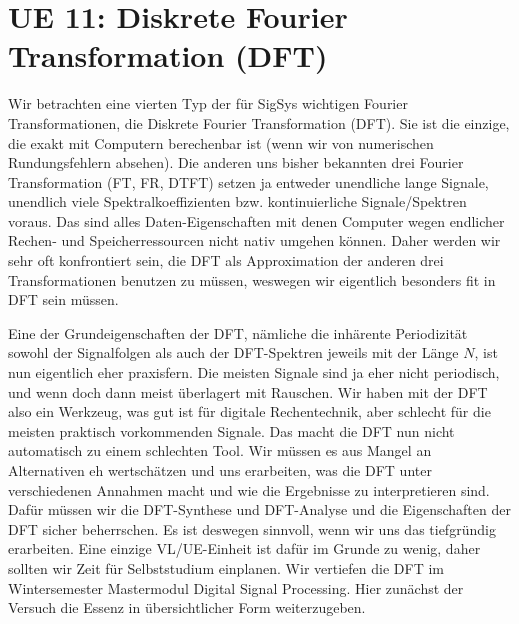 \newpage
\section{UE 11: Diskrete Fourier Transformation (DFT)}
%
Wir betrachten eine vierten Typ der für SigSys wichtigen Fourier Transformationen,
die Diskrete Fourier Transformation (DFT).
Sie ist die einzige, die exakt mit Computern berechenbar ist (wenn wir
von numerischen Rundungsfehlern absehen).
%
Die anderen uns bisher bekannten drei Fourier Transformation (FT, FR, DTFT)
setzen ja entweder
unendliche lange Signale, unendlich viele Spektralkoeffizienten bzw.
kontinuierliche Signale/Spektren
voraus. Das sind alles Daten-Eigenschaften mit denen Computer wegen endlicher
Rechen- und Speicherressourcen nicht nativ umgehen können.
%
Daher werden wir sehr oft konfrontiert sein, die DFT als Approximation
der anderen drei Transformationen benutzen zu müssen, weswegen wir eigentlich
besonders fit in DFT sein müssen.
%

Eine der Grundeigenschaften der DFT, nämliche die inhärente
Periodizität sowohl der Signalfolgen als auch der DFT-Spektren jeweils mit
der Länge $N$, ist nun eigentlich
eher praxisfern. Die meisten Signale sind ja eher nicht periodisch, und wenn
doch dann meist überlagert mit Rauschen.
%
Wir haben mit der DFT also ein Werkzeug, was gut ist für digitale Rechentechnik,
aber schlecht für die meisten praktisch vorkommenden Signale.
%
Das macht die DFT nun nicht automatisch zu einem schlechten Tool. Wir müssen
es aus Mangel an Alternativen eh wertschätzen und uns erarbeiten, was die
DFT unter verschiedenen Annahmen macht und wie die Ergebnisse zu interpretieren
sind.
%
Dafür müssen wir die DFT-Synthese und DFT-Analyse
und die Eigenschaften der DFT sicher beherrschen.
%
%
Es ist deswegen sinnvoll, wenn wir uns das tiefgründig erarbeiten. Eine einzige
VL/UE-Einheit ist dafür im Grunde zu wenig, daher sollten wir Zeit für
Selbststudium einplanen. Wir vertiefen die DFT im Wintersemester
Mastermodul Digital Signal Processing.
Hier zunächst der Versuch die Essenz in übersichtlicher Form weiterzugeben.

